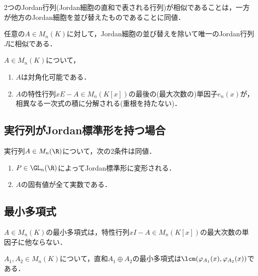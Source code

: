 \documentclass[uplatex, dvipdfmx]{jsreport}
\begin{document}
\begin{corollary}[Jordan標準形の共役類]
    2つのJordan行列(Jordan細胞の直和で表される行列)が相似であることは，一方が他方のJordan細胞を並び替えたものであることに同値．
\end{corollary}

\begin{theorem}[Jordan標準形]
    任意の$A\in M_n(K)$に対して，Jordan細胞の並び替えを除いて唯一のJordan行列$J$に相似である．
\end{theorem}

\begin{corollary}[対角化可能性の単因子による特徴付け]
    $A\in M_n(K)$について，
    \begin{enumerate}
        \item $A$は対角化可能である．
        \item $A$の特性行列$xE-A\in M_n(K[x])$の最後の(最大次数の)単因子$e_n(x)$が，相異なる一次式の積に分解される(重根を持たない)．
    \end{enumerate}
\end{corollary}

\subsection{実行列がJordan標準形を持つ場合}

\begin{theorem}
    実行列$A\in M_n(\R)$について，次の2条件は同値．
    \begin{enumerate}
        \item $P\in\GL_n(\R)$によってJordan標準形に変形される．
        \item $A$の固有値が全て実数である．
    \end{enumerate}
\end{theorem}

\subsection{最小多項式}

\begin{theorem}
    $A\in M_n(K)$の最小多項式は，特性行列$xI-A\in M_n(K[x])$の最大次数の単因子に他ならない．
\end{theorem}

\begin{proposition}[直和の最小多項式]
    $A_1,A_2\in M_n(K)$について，直和$A_1\oplus A_2$の最小多項式は$\lcm(\varphi_{A_1}(x),\varphi_{A_2}(x))$である．
\end{proposition}
\end{document}
